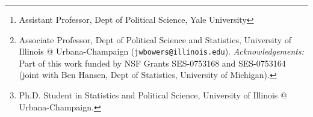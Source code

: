 \documentclass[12pt]{article}
\author{Peter Aronow \thanks{Assistant Professor, Dept of Political Science,
    Yale University} \and Jake Bowers \thanks{Associate Professor, Dept of Political
    Science and Statistics, University of Illinois @ Urbana-Champaign
    (\texttt{jwbowers@illinois.edu}). \textit{Acknowledgements:} Part
    of this work funded by NSF Grants SES-0753168 and SES-0753164
    (joint with Ben Hansen, Dept of Statistics, University of
    Michigan).} \and Mark Fredrickson \thanks{Ph.D. Student in Statistics and Political Science, University of Illinois @ Urbana-Champaign.}}
\date{\today}
\begin{document}
\VerbatimFootnotes

\abovedisplayshortskip=0pt
\belowdisplayshortskip=0pt
\abovedisplayskip=0pt
\belowdisplayskip=0pt




\cleardoublepage
\begin{singlespacing}
\setcounter{mycounter}{0}
\let\osection\section
\renewcommand{\section}{\stepcounter{mycounter}\osection}
\renewcommand\thesection{Appendix \Alph{mycounter}}
%

\clearpage
 


% 
% 
\end{singlespacing}
%
\end{document}
